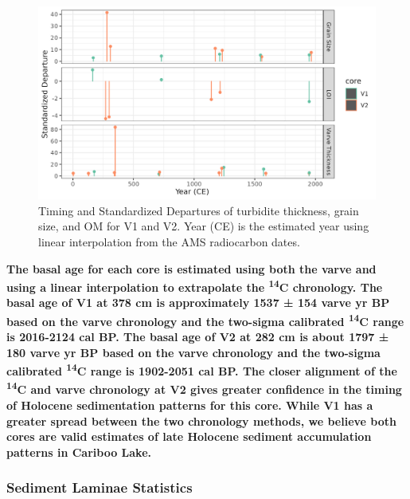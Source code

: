 \documentclass[Royal,times,doublespace,sageh]{sagej}
\begin{document}
\begin{figure}

{\centering \includegraphics[width=1\linewidth]{figs/turbidite_plot} 

}

\caption{Timing and Standardized Departures of turbidite thickness, grain size, and OM for V1 and V2. Year (CE) is the estimated year using linear interpolation from the AMS radiocarbon dates.\label{turbScatter}}\label{fig:turbScatter}
\end{figure}

\textbf{The basal age for each core is estimated using both the varve
and using a linear interpolation to extrapolate the
\textsuperscript{14}C chronology. The basal age of V1 at 378 cm is
approximately 1537 ± 154 varve yr BP based on the varve chronology and
the two-sigma calibrated \textsuperscript{14}C range is 2016-2124 cal
BP. The basal age of V2 at 282 cm is about 1797 ± 180 varve yr BP based
on the varve chronology and the two-sigma calibrated
\textsuperscript{14}C range is 1902-2051 cal BP. The closer alignment of
the \textsuperscript{14}C and varve chronology at V2 gives greater
confidence in the timing of Holocene sedimentation patterns for this
core. While V1 has a greater spread between the two chronology methods,
we believe both cores are valid estimates of late Holocene sediment
accumulation patterns in Cariboo Lake.}

\hypertarget{sediment-laminae-statistics}{%
\subsubsection{Sediment Laminae
Statistics}\label{sediment-laminae-statistics}}
\end{document}
